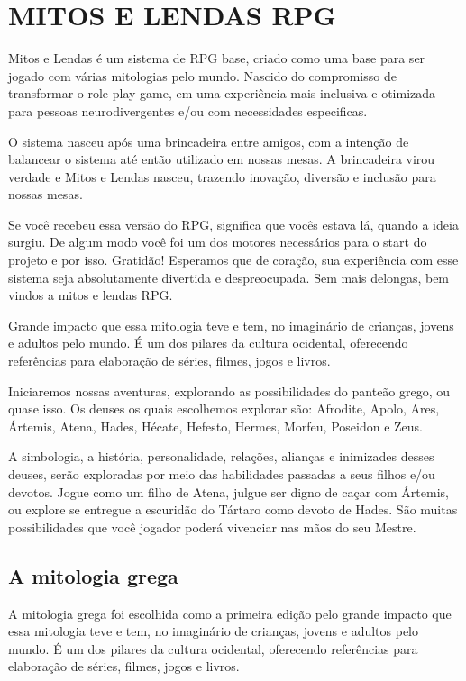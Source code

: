
\newenvironment{Introducao}{%
}{
\newpage
}

\begin{Introducao}
\section{MITOS E LENDAS RPG}

Mitos e Lendas é um sistema de RPG base, criado como uma base para ser jogado com várias mitologias pelo mundo. Nascido do compromisso de transformar o role play game, em uma experiência mais inclusiva e otimizada para pessoas neurodivergentes e/ou com necessidades especificas.

O sistema nasceu após uma brincadeira entre amigos, com a intenção de balancear o sistema até então utilizado em nossas mesas. A brincadeira virou verdade e Mitos e Lendas nasceu, trazendo inovação, diversão e inclusão para nossas mesas.

Se você recebeu essa versão do RPG, significa que vocês estava lá, quando a ideia surgiu. De algum modo você foi um dos motores necessários para o start do projeto e por isso. Gratidão! Esperamos que de coração, sua experiência com esse sistema seja absolutamente divertida e despreocupada. Sem mais delongas, bem vindos a mitos e lendas RPG.

Grande impacto que essa mitologia teve e tem, no imaginário de crianças, jovens e adultos pelo mundo. É um dos pilares da cultura ocidental, oferecendo referências para elaboração de séries, filmes, jogos e livros.

Iniciaremos nossas aventuras, explorando as possibilidades do panteão grego, ou quase isso. Os deuses os quais escolhemos explorar são: Afrodite, Apolo, Ares, Ártemis, Atena, Hades, Hécate, Hefesto, Hermes, Morfeu, Poseidon e Zeus.

A simbologia, a história, personalidade, relações, alianças e inimizades desses deuses, serão exploradas por meio das habilidades passadas a seus filhos e/ou devotos. Jogue como um filho de Atena, julgue ser digno de caçar com Ártemis, ou explore se entregue a escuridão do Tártaro como devoto de Hades. São muitas possibilidades que você jogador poderá vivenciar nas mãos do seu Mestre.

    \subsection{A mitologia grega}
    A mitologia grega foi escolhida como a primeira edição pelo grande impacto que essa mitologia teve e tem, no imaginário de crianças, jovens e adultos pelo mundo. É um dos pilares da cultura ocidental, oferecendo referências para elaboração de séries, filmes, jogos e livros.


\end{Introducao}
